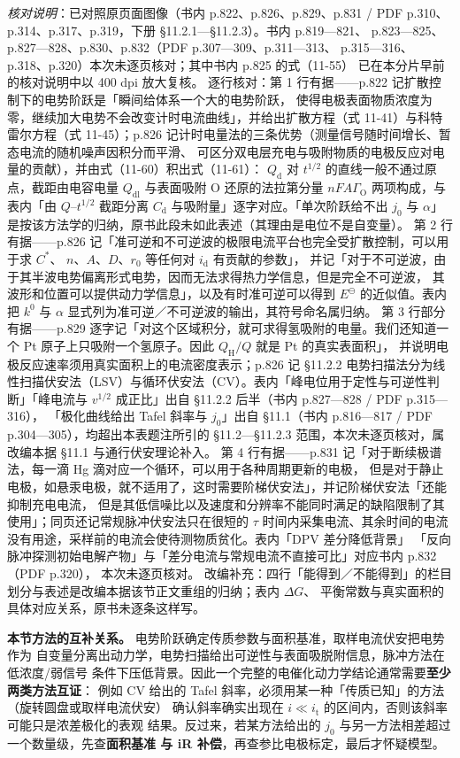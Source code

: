 \emph{核对说明}：已对照原页面图像（书内 p.822、p.826、p.829、p.831 / PDF
p.310、p.314、p.317、p.319，下册 §11.2.1—§11.2.3）。书内 p.819—821、
p.823—825、p.827—828、p.830、p.832（PDF p.307—309、p.311—313、
p.315—316、p.318、p.320）本次未逐页核对；其中书内 p.825 的式（11-55）
已在本分片早前的核对说明中以 400 dpi 放大复核。
逐行核对：第 1 行有据——p.822 记扩散控制下的电势阶跃是「瞬间给体系一个大的电势阶跃，
使得电极表面物质浓度为零，继续加大电势不会改变计时电流曲线」，并给出扩散方程（式 11-41）与科特雷尔方程（式
11-45）；p.826 记计时电量法的三条优势（测量信号随时间增长、暂态电流的随机噪声因积分而平滑、
可区分双电层充电与吸附物质的电极反应对电量的贡献），并由式（11-60）积出式（11-61）：
$Q_{\mathrm{d}}$ 对 $t^{1/2}$ 的直线一般不通过原点，截距由电容电量
$Q_{\mathrm{dl}}$ 与表面吸附 O 还原的法拉第分量
$nFA\Gamma_{\mathrm{O}}$ 两项构成，与表内「由 $Q$--$t^{1/2}$ 截距分离
$C_{\mathrm{d}}$ 与吸附量」逐字对应。「单次阶跃给不出 $j_{0}$ 与 $\alpha$」
是按该方法学的归纳，原书此段未如此表述（其理由是电位不是自变量）。
第 2 行有据——p.826 记「准可逆和不可逆波的极限电流平台也完全受扩散控制，可以用于求 $C^{*}$、
$n$、$A$、$D$、$r_{0}$ 等任何对 $i_{\mathrm{d}}$ 有贡献的参数」，
并记「对于不可逆波，由于其半波电势偏离形式电势，因而无法求得热力学信息，但是完全不可逆波，
其波形和位置可以提供动力学信息」，以及有时准可逆可以得到 $E^{\ominus}$ 的近似值。表内把
$k^{0}$ 与 $\alpha$ 显式列为准可逆／不可逆波的输出，其符号命名属归纳。
第 3 行部分有据——p.829 逐字记「对这个区域积分，就可求得氢吸附的电量。我们还知道一个 Pt
原子上只吸附一个氢原子。因此 $Q_{\mathrm{H}}/Q$ 就是 Pt 的真实表面积」，
并说明电极反应速率须用真实面积上的电流密度表示；p.826 记 §11.2.2
电势扫描法分为线性扫描伏安法（LSV）与循环伏安法（CV）。表内「峰电位用于定性与可逆性判断」「峰电流与
$v^{1/2}$ 成正比」出自 §11.2.2 后半（书内 p.827—828 / PDF p.315—316），
「极化曲线给出 Tafel 斜率与 $j_{0}$」出自 §11.1（书内 p.816—817 / PDF
p.304—305），均超出本表题注所引的 §11.2—§11.2.3 范围，本次未逐页核对，属改编本据
§11.1 与通行伏安理论补入。
第 4 行有据——p.831 记「对于断续极谱法，每一滴 Hg 滴对应一个循环，可以用于各种周期更新的电极，
但是对于静止电极，如悬汞电极，就不适用了，这时需要阶梯伏安法」，并记阶梯伏安法「还能抑制充电电流，
但是其低信噪比以及速度和分辨率不能同时满足的缺陷限制了其使用」；同页还记常规脉冲伏安法只在很短的 $\tau$
时间内采集电流、其余时间的电流没有用途，采样前的电流会使待测物质贫化。表内「DPV 差分降低背景」
「反向脉冲探测初始电解产物」与「差分电流与常规电流不直接可比」对应书内 p.832（PDF p.320），
本次未逐页核对。
改编补充：四行「能得到／不能得到」的栏目划分与表述是改编本据该节正文重组的归纳；表内 $\Delta G$、
平衡常数与真实面积的具体对应关系，原书未逐条这样写。


\begin{crosscheck}
\textbf{本节方法的互补关系。} 电势阶跃确定传质参数与面积基准，取样电流伏安把电势作为
自变量分离出动力学，电势扫描给出可逆性与表面吸脱附信息，脉冲方法在低浓度/弱信号
条件下压低背景。因此一个完整的电催化动力学结论通常需要\textbf{至少两类方法互证}：
例如 CV 给出的 Tafel 斜率，必须用某一种「传质已知」的方法（旋转圆盘或取样电流伏安）
确认斜率确实出现在 $i\ll i_{\mathrm{t}}$ 的区间内，否则该斜率可能只是浓差极化的表观
结果。反过来，若某方法给出的 $j_0$ 与另一方法相差超过一个数量级，先查\textbf{面积基准
与 iR 补偿}，再查参比电极标定，最后才怀疑模型。
\end{crosscheck}
